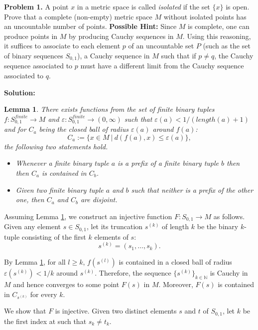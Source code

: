\documentclass[12pt]{article}
\def\black{\color{black}}
\def\green{\color{rltgreen}}
\newtheorem{lemma}{Lemma}
\newcommand\bi{\begin{itemize}}
\newcommand\ei{\end{itemize}}
\renewcommand\|{\ | \ }
\newcommand\ra{\rightarrow}
\newcommand\N{\mathbb{N}}
\def\pb#1{{\green \bf Problem #1.}\hskip 8pt \black}
\def\sol{\textbf{Solution:}}
\newcommand\e\varepsilon
\begin{document}

\pb{1}
A point $x$ in a metric space is called \emph{isolated} if the set
$\{x\}$ is open. Prove that a complete (non-empty) metric space $M$ without
isolated points has an uncountable number of points. 
\textbf{Possible Hint:} Since $M$ is complete, one can produce points in $M$
by producing Cauchy sequences in $M$. Using this reasoning, it suffices to
associate to each element $p$ of an uncountable set $P$ (such as the set of
binary sequences $S_{0, 1}$), a Cauchy sequence in $M$ such that if $p \neq q$,
the Cauchy sequence associated to $p$ must have a different limit from the 
Cauchy sequence associated to $q$.

\sol

\begin{lemma}
\label{lem:disjoint-balls}
There exists functions from the set of \emph{finite} binary tuples
$f:S_{0, 1}^{finite} \ra M$ and $\e:S_{0, 1}^{finite} \ra (0, \infty)$ 
such that $\e(a) < 1 / (length(a) + 1)$
and for $C_a$ being the closed ball of radius $\e(a)$ around $f(a)$:
\[
C_{a} := \{x \in M \| d(f(a), x) \leq \e(a)\},
\]
the following two statements hold.
\bi
\item
Whenever a finite binary tuple $a$ is a prefix of a finite binary
tuple $b$ then then $C_a$ is contained in $C_b$.
\item
Given two finite binary tuple $a$ and $b$ such that neither is a prefix
of the other one, then $C_a$ and $C_b$ are disjoint.
\ei
\end{lemma}

Assuming Lemma \ref{lem:disjoint-balls}, we construct an injective 
function $F: S_{0, 1} \ra M$ as follows.
Given any element $s \in S_{0, 1}$, let its 
truncation $s^{(k)}$ of length $k$ be the binary $k$-tuple
consisting of the first $k$ elements of $s$:
\[
s^{(k)} = (s_1, \ldots, s_k).
\]

By Lemma \ref{lem:disjoint-balls}, for all $l \geq k$, 
$f(s^{(l)})$ is contained in a closed ball of radius
$\e(s^{(k)}) < 1 / k$ around $s^{(k)}$. Therefore,
the sequence $\{s^{(k)}\}_{k\in \N}$ is Cauchy in $M$ and hence
converges to some point $F(s)$ in $M$. Moreover, 
$F(s)$ is contained in $C_{s^(k)}$ for every $k$.

We show that
$F$ is injective. Given two distinct elements $s$ and $t$ 
of $S_{0, 1}$, let $k$ be the first index at such that $s_k \neq t_k$.
\end{document}
